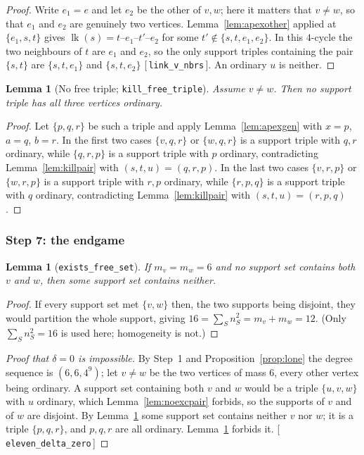 \documentclass[11pt,reqno]{amsart}
\newcommand{\leanref}[1]{\textup{[\,\texttt{#1}\,]}}
\theoremstyle{plain}
\newtheorem{lemma}[theorem]{Lemma}
\theoremstyle{definition}
\numberwithin{theorem}{section}
\newcommand{\lk}{\operatorname{lk}}
\begin{document}
\begin{proof}
Write $e_1 = e$ and let $e_2$ be the other of $v, w$; here it matters that $v \ne w$, so that
$e_1$ and $e_2$ are genuinely two vertices. Lemma~\ref{lem:apexother} applied at $\{e_1,s,t\}$
gives $\lk(s) = t$--$e_1$--$t'$--$e_2$ for some $t' \notin \{s,t,e_1,e_2\}$. In this $4$-cycle
the two neighbours of $t$ are $e_1$ and $e_2$, so the only support triples containing the pair
$\{s,t\}$ are $\{s,t,e_1\}$ and $\{s,t,e_2\}$ \leanref{link\_v\_nbrs}. An ordinary $u$ is
neither.
\end{proof}

\begin{lemma}[No free triple; \texttt{kill\_free\_triple}]\label{lem:killfree}
Assume $v \ne w$. Then no support triple has all three vertices ordinary.
\end{lemma}

\begin{proof}
Let $\{p,q,r\}$ be such a triple and apply Lemma~\ref{lem:apexgen} with $x = p$, $a = q$,
$b = r$. In the first two cases $\{v,q,r\}$ or $\{w,q,r\}$ is a support triple with $q, r$
ordinary, while $\{q,r,p\}$ is a support triple with $p$ ordinary, contradicting
Lemma~\ref{lem:killpair} with $(s,t,u) = (q,r,p)$. In the last two cases $\{v,r,p\}$ or
$\{w,r,p\}$ is a support triple with $r, p$ ordinary, while $\{r,p,q\}$ is a support triple with
$q$ ordinary, contradicting Lemma~\ref{lem:killpair} with $(s,t,u) = (r,p,q)$.
\end{proof}

\subsubsection*{Step 7: the endgame}

\begin{lemma}[\texttt{exists\_free\_set}]\label{lem:freeset}
If $m_v = m_w = 6$ and no support set contains both $v$ and $w$, then some support set contains
neither.
\end{lemma}

\begin{proof}
If every support set met $\{v,w\}$ then, the two supports being disjoint, they would partition
the whole support, giving $16 = \sum_S n_S^2 = m_v + m_w = 12$. (Only $\sum_S n_S^2 = 16$ is
used here; homogeneity is not.)
\end{proof}

\begin{proof}[Proof that $\delta = 0$ is impossible]
By Step~1 and Proposition~\ref{prop:lone} the degree sequence is $(6,6,4^9)$; let $v \ne w$ be
the two vertices of mass $6$, every other vertex being ordinary. A support set containing both
$v$ and $w$ would be a triple $\{u,v,w\}$ with $u$ ordinary, which Lemma~\ref{lem:noexcpair}
forbids, so the supports of $v$ and of $w$ are disjoint. By Lemma~\ref{lem:freeset} some support
set contains neither $v$ nor $w$; it is a triple $\{p,q,r\}$, and $p, q, r$ are all ordinary.
Lemma~\ref{lem:killfree} forbids it. \leanref{eleven\_delta\_zero}
\end{proof}
\end{document}
